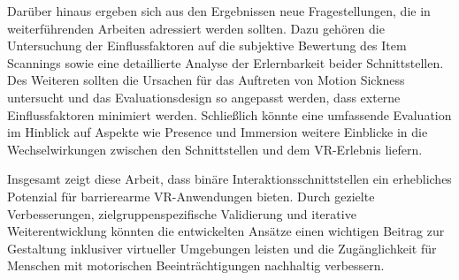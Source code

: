 Darüber hinaus ergeben sich aus den Ergebnissen neue Fragestellungen, die in weiterführenden Arbeiten adressiert werden sollten. Dazu gehören die Untersuchung der Einflussfaktoren auf die subjektive Bewertung des Item Scannings sowie eine detaillierte Analyse der Erlernbarkeit beider Schnittstellen. Des Weiteren sollten die Ursachen für das Auftreten von Motion Sickness untersucht und das Evaluationsdesign so angepasst werden, dass externe Einflussfaktoren minimiert werden. Schließlich könnte eine umfassende Evaluation im Hinblick auf Aspekte wie Presence und Immersion weitere Einblicke in die Wechselwirkungen zwischen den Schnittstellen und dem VR-Erlebnis liefern.

Insgesamt zeigt diese Arbeit, dass binäre Interaktionsschnittstellen ein erhebliches Potenzial für barrierearme VR-Anwendungen bieten. Durch gezielte Verbesserungen, zielgruppenspezifische Validierung und iterative Weiterentwicklung könnten die entwickelten Ansätze einen wichtigen Beitrag zur Gestaltung inklusiver virtueller Umgebungen leisten und die Zugänglichkeit für Menschen mit motorischen Beeinträchtigungen nachhaltig verbessern.